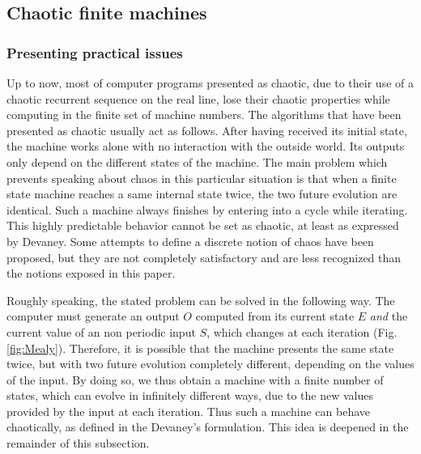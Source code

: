 \subsection{Chaotic finite machines}


\subsubsection{Presenting practical issues}



Up to now, most of computer programs presented as chaotic, due to their
use of a chaotic recurrent sequence on the real line,
 lose their chaotic 
properties while computing in the finite set of machine numbers.
The algorithms that have been presented as chaotic usually act as follows.
After having received its initial state, the machine works alone with no interaction with the outside world.
Its outputs only depend on the different states of the machine.
The main problem which prevents speaking about chaos in this particular situation is that when a finite state machine reaches a same internal state twice, the two future evolution are identical.
Such a machine always finishes by entering into a cycle while iterating.
This highly predictable behavior cannot be set as chaotic, at least as expressed by Devaney.
Some attempts to define a discrete notion of chaos have been proposed, but they are not completely satisfactory and are less recognized than the notions exposed in this paper.

\medskip

Roughly speaking, the stated problem can be solved in the following way.
The computer must generate an output $O$ computed from its current state $E$ \emph{and} the current value of an non periodic input $S$, which changes at each iteration (Fig. \ref{fig:Mealy}).
Therefore, it is possible that the machine presents the same state twice, but with two future evolution completely different, depending on the values of the input.
By doing so, we thus obtain a machine with a finite number of states, which can evolve in infinitely different ways, due to the new values provided by the input at each iteration.
Thus such a machine can behave chaotically, as defined in the Devaney's formulation.
This idea is deepened in the remainder of this subsection.

